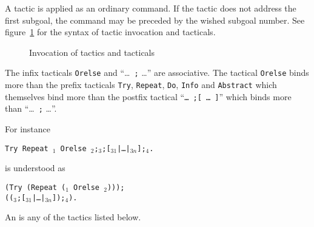 A tactic is
applied as an ordinary command. If the tactic does not
address the first subgoal, the command may be preceded by the
wished subgoal number. See figure~\ref{InvokeTactic} for the syntax of
tactic invocation and tacticals.

\medskip

\begin{figure}[t]
\begin{center}
\end{center}
\caption{Invocation of tactics and tacticals}
\label{InvokeTactic}
\end{figure}

\begin{Remarks}
\item The infix tacticals {\tt Orelse} and ``\dots\ {\tt ;} \dots'' are
associative. 
The tactical {\tt Orelse} binds more than the prefix tacticals
{\tt Try}, {\tt Repeat}, {\tt Do}, {\tt Info} and {\tt Abstract} which
themselves bind more than  
the postfix tactical ``{\tt \dots\ ;[ \dots\ ]}'' which 
binds more than ``\dots\ {\tt ;} \dots''.

For instance
\begin{tabbing}
{\tt Try Repeat \tac$_1$ Orelse
  \tac$_2$;\tac$_3$;[\tac$_{31}$|\dots|\tac$_{3n}$];\tac$_4$.}
\end{tabbing}
is understood as 
\begin{tabbing}
{\tt (Try (Repeat (\tac$_1$ Orelse \tac$_2$)));} \\
{\tt ((\tac$_3$;[\tac$_{31}$|\dots|\tac$_{3n}$]);\tac$_4$).}
\end{tabbing}


\item An {\atomictac} is any of the tactics listed below.
\end{Remarks}

